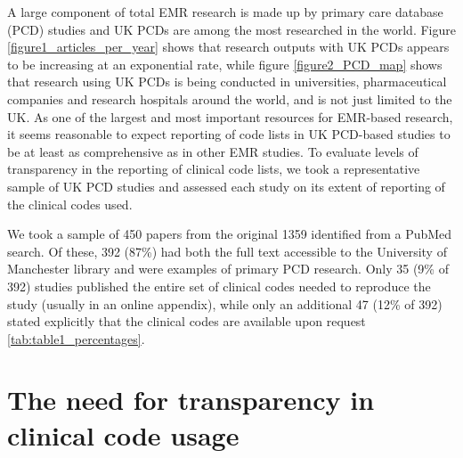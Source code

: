 \documentclass[10pt]{article}
\begin{document}
A large component of total EMR research is made up by primary care database (PCD) studies and UK PCDs are among the most researched in the world.  Figure \ref{figure1_articles_per_year} shows that research outputs with UK PCDs appears to be increasing at an exponential rate, while figure \ref{figure2_PCD_map} shows that research using UK PCDs is being conducted in universities, pharmaceutical companies and research hospitals around the world, and is not just limited to the UK.  As one of the largest and most important resources for EMR-based research, it seems reasonable to expect reporting of code lists in UK PCD-based studies to be at least as comprehensive as in other EMR studies.  To evaluate levels of transparency in the reporting of clinical code lists, we took a representative sample of UK PCD studies and assessed each study on its extent of reporting of the clinical codes used.

We took a sample of 450 papers from the original 1359 identified from a PubMed search.  Of these, 392 (87\%) had both  the full text accessible to the University of Manchester library and were examples of primary PCD research.  Only 35 (9\% of 392) studies published the entire set of clinical codes needed to reproduce the study (usually in an online appendix), while only an additional 47 (12\% of 392) stated explicitly that the clinical codes are available upon request \ref{tab:table1_percentages}.


\section*{The need for transparency in clinical code usage}
\end{document}
